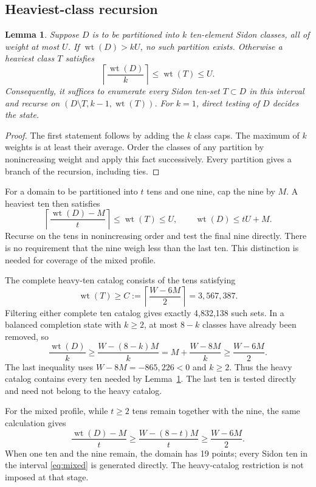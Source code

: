 \documentclass[11pt]{article}
\newtheorem{lemma}[theorem]{Lemma}
\newcommand{\wt}{\operatorname{wt}}
\begin{document}
\subsection{Heaviest-class recursion}\label{sec:recursion}
\begin{lemma}\label{lem:heaviest}
Suppose $D$ is to be partitioned into $k$ ten-element Sidon classes,
all of weight at most $U$. If $\wt(D)>kU$, no such partition exists.
Otherwise a heaviest class $T$ satisfies
\[
              \left\lceil\frac{\wt(D)}k\right\rceil
              \leq\wt(T)\leq U.
\]
Consequently, it suffices to enumerate every Sidon ten-set $T\subset D$
in this interval and recurse on $(D\setminus T,k-1,\wt(T))$.
For $k=1$, direct testing of $D$ decides the state.
\end{lemma}
\begin{proof}
The first statement follows by adding the $k$ class caps. The maximum
of $k$ weights is at least their average. Order the classes of any
partition by nonincreasing weight and apply this fact successively.
Every partition gives a branch of the recursion, including ties.
\end{proof}

For a domain to be partitioned into $t$ tens and one nine, cap the nine
by $M$. A heaviest ten then satisfies
\begin{equation}\label{eq:mixed}
 \left\lceil\frac{\wt(D)-M}{t}\right\rceil\leq\wt(T)\leq U,
 \qquad \wt(D)\leq tU+M.
\end{equation}
Recurse on the tens in nonincreasing order and test the final nine
directly. There is no requirement that the nine weigh less than the
last ten. This distinction is needed for coverage of the mixed profile.

The complete heavy-ten catalog consists of the tens satisfying
\begin{equation}\label{eq:cutoff}
       \wt(T)\geq C:=\left\lceil\frac{W-6M}{2}\right\rceil
                    =3{,}567{,}387.
\end{equation}
Filtering either complete ten catalog gives exactly 4,832,138 such sets.
In a balanced completion state with $k\geq2$, at most $8-k$ classes
have already been removed, so
\[
 \frac{\wt(D)}k\geq\frac{W-(8-k)M}{k}
             =M+\frac{W-8M}{k}\geq\frac{W-6M}{2}.
\]
The last inequality uses $W-8M=-865{,}226<0$ and $k\geq2$.
Thus the heavy catalog contains every ten needed by
Lemma~\ref{lem:heaviest}. The last ten is tested directly and need not
belong to the heavy catalog.

For the mixed profile, while $t\geq2$ tens remain together with the
nine, the same calculation gives
\[
 \frac{\wt(D)-M}{t}\geq\frac{W-(8-t)M}{t}
             \geq\frac{W-6M}{2}.
\]
When one ten and the nine remain, the domain has 19 points; every
Sidon ten in the interval \eqref{eq:mixed} is generated directly.
The heavy-catalog restriction is not imposed at that stage.
\end{document}
